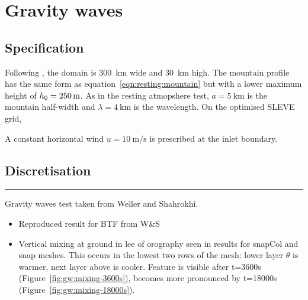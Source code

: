 \section{Gravity waves}
\label{sec:gw}


\subsection{Specification}
Following \textcite{melvin2010}, the domain is \SI{300}{\kilo\meter} wide and \SI{30}{\kilo\meter} high.  The mountain profile has the same form as equation~\ref{eqn:resting:mountain} but with a lower maximum height of $h_0 = \SI{250}{\meter}$.  As in the resting atmopshere test, $a = \SI{5}{\kilo\meter}$ is the mountain half-width and $\lambda = \SI{4}{\kilo\meter}$ is the wavelength.  On the optimised SLEVE grid, 



A constant horizontal wind $u = \SI{10}{\meter\per\second}$ is prescribed at the inlet boundary.


\subsection{Discretisation}


\hrule

Gravity waves test taken from Weller and Shahrokhi.

\begin{itemize}
\item Reproduced result for BTF from W\&S
\item Vertical mixing at ground in lee of orography seen in results for snapCol and snap meshes.  This occurs in the lowest two rows of the mesh: lower layer $\theta$ is warmer, next layer above is cooler.  Feature is visible after t=3600s (Figure~\ref{fig:gw:mixing-3600s}), becomes more pronounced by t=18000s (Figure~\ref{fig:gw:mixing-18000s}).
\end{itemize}

